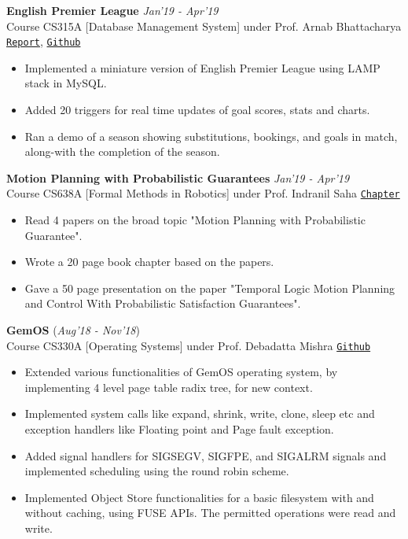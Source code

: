 \documentclass[10pt]{extarticle}
\begin{document}
\vspace{2mm}
\textbf{English Premier League} 
\hfill\hfill\textit{Jan'19 - Apr'19}\\
Course CS315A [Database Management System] under Prof. Arnab Bhattacharya
\hfill
\href{https://drive.google.com/open?id=1jrmoUkKQsdSrfBb3sb7SXW7nT3tW8aFx}{\texttt{Report}}, 
\href{https://github.com/SahilDhull/EPL}{\texttt{Github}}
\begin{itemize}
\renewcommand\labelitemi{--}
\item Implemented a miniature version of English Premier League using LAMP stack in MySQL.
\item Added 20 triggers for real time updates of goal scores, stats and charts.
\item Ran a demo of a season showing substitutions, bookings, and goals in match, along-with the completion of the season.
\end{itemize}
\vspace{2mm}
\textbf{Motion Planning with Probabilistic Guarantees}
\hfill\hfill\textit{Jan'19 - Apr'19}\\
Course CS638A [Formal Methods in Robotics] under Prof. Indranil Saha
\hfill
\href{https://drive.google.com/open?id=1sBdSDRLIF9iEaQYQkGyBC9rGSwJIx3VO}{\texttt{Chapter}}
\begin{itemize}
\renewcommand\labelitemi{--}
\item Read 4 papers on the broad topic "Motion Planning with Probabilistic Guarantee".
\item Wrote a 20 page book chapter based on the papers.
\item Gave a 50 page presentation on the paper "Temporal Logic Motion Planning and Control With Probabilistic Satisfaction Guarantees".
\end{itemize}
\vspace{2mm}
\textbf{GemOS}
\hfill\hfill(\textit{Aug'18 - Nov'18})\\
Course CS330A [Operating Systems] under Prof. Debadatta Mishra
\hfill
\href{https://github.com/SahilDhull/Assign_OS}{\texttt{Github}}
\begin{itemize}
\renewcommand\labelitemi{--}
\item Extended various functionalities of GemOS operating system, by implementing 4 level page table radix tree, for new context.
\item Implemented system calls like expand, shrink, write, clone, sleep etc and exception handlers like Floating point and Page fault exception.
\item  Added signal handlers for SIGSEGV, SIGFPE, and SIGALRM signals and implemented scheduling using the round robin scheme.
\item Implemented Object Store functionalities for a basic filesystem with and without caching, using FUSE APIs. The permitted operations were read and write.
\end{itemize}
\end{document}
